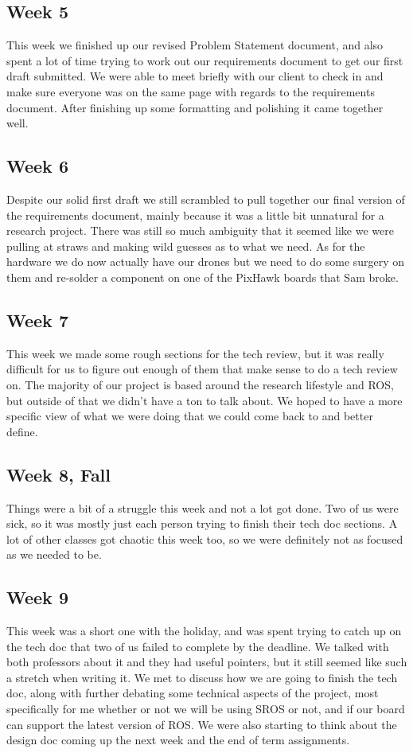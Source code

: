 \documentclass[IEEEtran,letterpaper,10pt,notitlepage,draftclsnofoot,onecolumn]{article}
\begin{document}
\subsection{Week 5}
This week we finished up our revised Problem Statement document, and also spent a lot of time trying to work out our requirements document to get our first draft submitted. 
We were able to meet briefly with our client to check in and make sure everyone was on the same page with regards to the requirements document. 
After finishing up some formatting and polishing it came together well.

\subsection{Week 6}
Despite our solid first draft we still scrambled to pull together our final version of the requirements document, mainly because it was a little bit unnatural for a research project. 
There was still so much ambiguity that it seemed like we were pulling at straws and making wild guesses as to what we need. 
As for the hardware we do now actually have our drones but we need to do some surgery on them and re-solder a component on one of the PixHawk boards that Sam broke.

\subsection{Week 7}
This week we made some rough sections for the tech review, but it was really difficult for us to figure out enough of them that make sense to do a tech review on. 
The majority of our project is based around the research lifestyle and ROS, but outside of that we didn't have a ton to talk about. 
We hoped to have a more specific view of what we were doing that we could come back to and better define.

\subsection{Week 8, Fall}
Things were a bit of a struggle this week and not a lot got done. 
Two of us were sick, so it was mostly just each person trying to finish their tech doc sections. 
A lot of other classes got chaotic this week too, so we were definitely not as focused as we needed to be.

\subsection{Week 9}
This week was a short one with the holiday, and was spent trying to catch up on the tech doc that two of us failed to complete by the deadline. 
We talked with both professors about it and they had useful pointers, but it still seemed like such a stretch when writing it. 
We met to discuss how we are going to finish the tech doc, along with further debating some technical aspects of the project, most specifically for me whether or not we will be using SROS or not, and if our board can support the latest version of ROS. 
We were also starting to think about the design doc coming up the next week and the end of term assignments.
\end{document}
